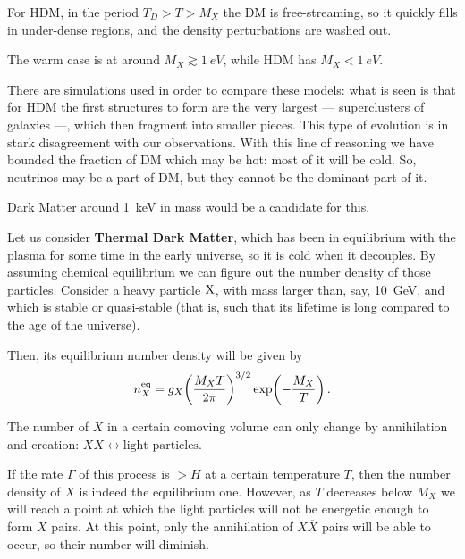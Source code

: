 \documentclass[main.tex]{subfiles}
\begin{document}
For HDM, in the period \(T_D > T > M_X\) the DM is free-streaming, so it quickly fills in under-dense regions, and the density perturbations are washed out.

The warm case is at around \(M_X \gtrsim \SI{1}{eV}\), while HDM has \(M_X < \SI{1}{eV}\). 

There are simulations used in order to compare these models: what is seen is that for HDM the first structures to form are the very largest --- superclusters of galaxies ---, which then fragment into smaller pieces. 
This type of evolution is in stark disagreement with our observations.
With this line of reasoning we have bounded the fraction of DM which may be hot: most of it will be cold. 
So, neutrinos may be a part of DM, but they cannot be the dominant part of it.



Dark Matter around \SI{1}{keV} in mass would be a candidate for this. 

Let us consider \textbf{Thermal Dark Matter}, which has been in equilibrium with the plasma for some time in the early universe, so it is cold when it decouples.
By assuming chemical equilibrium we can figure out the number density of those particles.
Consider a heavy particle \(\ce{X}\), with mass larger than, say, \SI{10}{GeV}, and which is stable or quasi-stable (that is, such that its lifetime is long compared to the age of the universe).

Then, its equilibrium number density will be given by 
%
\begin{align}
n_X ^{\text{eq}} = g_X \qty(\frac{M_X T}{2 \pi })^{3/2} \exp(- \frac{M_X}{T})
\,.
\end{align}

The number of \(X\) in a certain comoving volume can only change by annihilation and creation: \(X \overline{X} \leftrightarrow \text{light particles}\).

If the rate \(\Gamma \) of this process is \(>H\) at a certain temperature \(T\), then the number density of \(X\) is indeed the equilibrium one. 
However, as \(T\) decreases below \(M_X\) we will reach a point at which the light particles will not be energetic enough to form \(X\) pairs. 
At this point, only the annihilation of \(X \overline{X}\) pairs will be able to occur, so their number will diminish. 
\end{document}
